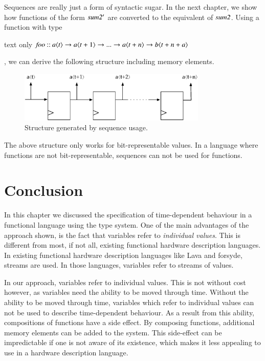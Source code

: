 Sequences are really just a form of syntactic sugar.
In the next chapter, we show how functions of the form \ensuremath{\Varid{sum2'}} are converted to the equivalent of \ensuremath{\Varid{sum2}}.
Using a function with type
\begin{changemargin}{1cm}{0cm}
\begin{expansionno}{text only}
\ensuremath{\Varid{foo}\mathbin{::}\Varid{a}\langle\Varid{t}\rangle\to \Varid{a}\langle\Varid{t}\mathbin{+}\mathrm{1}\rangle\to \mathbin{...}\to \Varid{a}\langle\Varid{t}\mathbin{+}\Varid{n}\rangle\to \Varid{b}\langle\Varid{t}\mathbin{+}\Varid{n}\mathbin{+}\Varid{a}\rangle}
\end{expansionno}
\end{changemargin}
, we can derive the following structure including memory elements.

\begin{figure}[H]
\begin{center}
\centering
\includegraphics[width=0.8\textwidth]{images/sequence}
\end{center}
\caption{Structure generated by sequence usage.} \label{fig:sequence}
\end{figure}

The above structure only works for bit-representable values.
In a language where functions are not bit-representable, sequences can not be used for functions.

\section{Conclusion}
In this chapter we discussed the specification of time-dependent behaviour in a functional language using the type system.
One of the main advantages of the approach shown, is the fact that variables refer to \textit{individual values}.
This is different from most, if not all, existing functional hardware description languages.
In existing functional hardware description languages like Lava and \gls{forsyde}, streams are used.
In those languages, variables refer to streams of values.

In our approach, variables refer to individual values.
This is not without cost however, as variables need the ability to be moved through time.
Without the ability to be moved through time, variables which refer to individual values can not be used to describe time-dependent behaviour.
As a result from this ability, compositions of functions have a side effect.
By composing functions, additional memory elements can be added to the system.
This side-effect can be impredictable if one is not aware of its existence, which makes it less appealing to use in a hardware description language.

